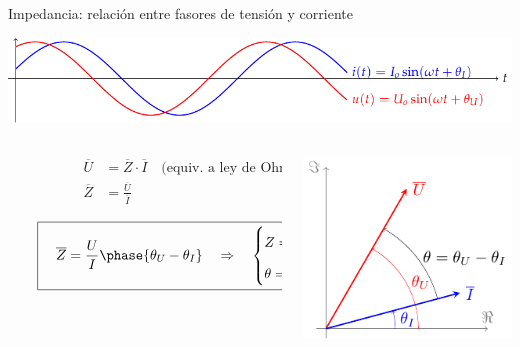 \documentclass[aspectratio=169, usenames,svgnames,dvipsnames]{beamer}
\begin{document}
\begin{frame}{Impedancia: \hspace{3mm}relación entre fasores de tensión y corriente}
    \vspace{2mm}
    \begin{center}
        \includegraphics[width=.9\linewidth]{../figs/ondasTensionCorriente.pdf}
    \end{center}

    \vspace{-7mm}
    \begin{columns}
    \begin{column}{0.5\columnwidth}

        \vspace{3mm} 
        \begin{align*}
          \qquad\qquad\quad \overline{U} &= \overline{Z} \cdot \overline{I} \quad \text{(equiv. a ley de Ohm)}\\[10pt] 
          \qquad\qquad\quad \overline{Z} &= \frac{\overline{U}}{\overline{I}}
        \end{align*}

        \vspace{-6mm} 
        \[
        \qquad \boxed{\quad \overline{Z} = \frac{U}{I}\phase{\theta_U - \theta_I} \quad \Rightarrow \quad
            \begin{cases}
              Z = \dfrac{U}{I}\\[8pt]
              \theta = \theta_U - \theta_I
            \end{cases}}
        \]
    \end{column}    
    \begin{column}{0.5\columnwidth}
        \begin{center}
            \includegraphics[height=0.6\textheight]{../figs/fasorTensionCorriente.pdf}
        \end{center}
    \end{column}
    \end{columns}
\end{frame}
\end{document}
